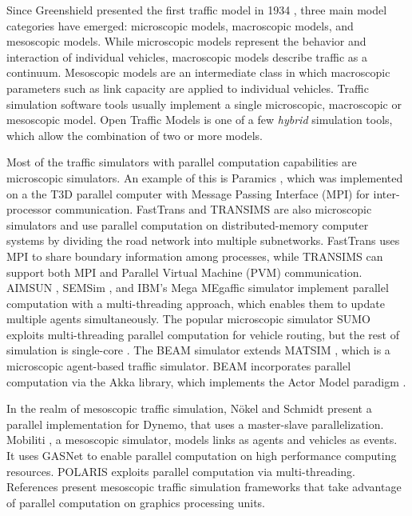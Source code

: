 Since Greenshield presented the first traffic model in 1934 \cite{greenshields1934photographic}, three main model categories have emerged: microscopic models, macroscopic models, and mesoscopic models. While microscopic models represent the behavior and interaction of individual vehicles,  macroscopic models describe traffic as a continuum. Mesoscopic models are an intermediate class in which macroscopic parameters such as link capacity are applied to individual vehicles. Traffic simulation software tools usually implement a single microscopic, macroscopic or mesoscopic model. Open Traffic Models is one of a few  \textit{hybrid} simulation tools, which allow the combination of two or more models. 

Most of the traffic simulators with parallel computation capabilities are microscopic simulators. An example of this is Paramics \cite{cameron1996paramics}, which was implemented on a the T3D parallel computer with Message Passing Interface (MPI) for inter-processor communication. FastTrans \cite{thulasidasan2009accelerating} and TRANSIMS \cite{nagel2001parallel} are also microscopic simulators and use parallel computation on distributed-memory computer systems by dividing the road network into multiple subnetworks. FastTrans uses MPI to share boundary information among processes, while TRANSIMS can support both MPI and Parallel Virtual Machine (PVM) communication. AIMSUN \cite{ferrer1993aimsun2}, SEMSim \cite{aydt2013multi}, and IBM's Mega MEgaffic simulator \cite{osogami2012research} implement parallel computation with a multi-threading approach, which enables them to update multiple agents simultaneously. The popular microscopic simulator SUMO
exploits multi-threading parallel computation for vehicle routing, but the rest of simulation is single-core \cite{behrisch2011sumo}.
The BEAM simulator \cite{aboutBeam} extends MATSIM \cite{horni2016multi}, which is a microscopic agent-based traffic simulator. BEAM incorporates parallel computation via the Akka \cite{akka} library, which implements the Actor Model paradigm \cite{actorModel}. 

 In the realm of mesoscopic traffic simulation, N{\"o}kel and Schmidt present a parallel implementation for Dynemo, that uses a master-slave parallelization. Mobiliti \cite{chan2018mobiliti}, a mesoscopic simulator, models links as agents and vehicles as events. It uses GASNet \cite{gasnet} to enable parallel computation on high performance computing resources. POLARIS  \cite{auld2016polaris} exploits parallel computation via multi-threading. References  \cite{xu2014mesoscopic,song2017supporting,strippgen2009multi} present mesoscopic traffic simulation frameworks that take advantage of parallel computation on graphics processing units. 

